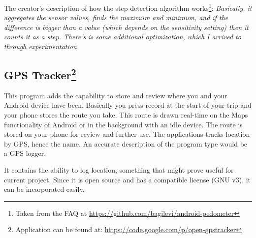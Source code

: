 The creator's description of how the step detection algorithm works\footnote{Taken from the FAQ at \url{https://github.com/bagilevi/android-pedometer}}: \textit{Basically, it aggregates the sensor values, finds the maximum and minimum, and if the difference is bigger than a value (which depends on the sensitivity setting) then it counts it as a step. There's is some additional optimization, which I arrived to through experimentation.}

\subsection{GPS Tracker\footnote{Application can be found at: \url{https://code.google.com/p/open-gpstracker}}}
This program adds the capability to store and review where you and your Android device have been. Basically you press record at the start of your trip and your phone stores the route you take. This route is drawn real-time on the Maps functionality of Android or in the background with an idle device. The route is stored on your phone for review and further use. The applications tracks location by GPS, hence the name. An accurate description of the program type would be a GPS logger.

It contains the ability to log location, something that might prove useful for current project. Since it is open source and has a compatible license (GNU v3), it can be incorporated easily.